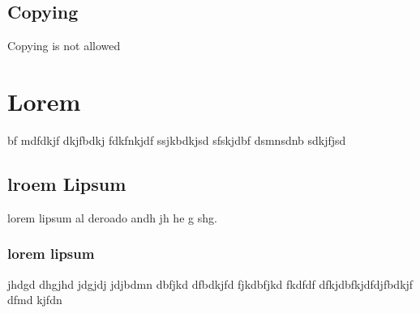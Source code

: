 \documentclass[
11pt, english, singlespacing, headsepline,oneside]{Documantation}
\begin{document}
\section{Copying}
Copying is not allowed

\chapter{Lorem}
bf mdfdkjf dkjfbdkj fdkfnkjdf ssjkbdkjsd sfskjdbf dsmnsdnb sdkjfjsd 
\section{lroem Lipsum}
lorem lipsum al deroado andh jh he g shg. 
\subsection{lorem lipsum}
jhdgd dhgjhd jdgjdj jdjbdmn dbfjkd dfbdkjfd fjkdbfjkd fkdfdf dfkjdbfkjdfdjfbdkjf dfmd kjfdn


\printbibliography
{}
\end{document}
